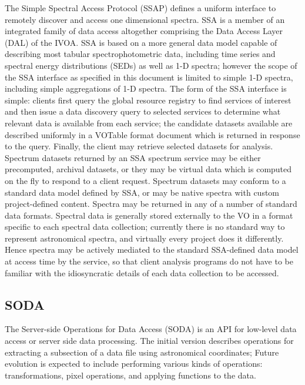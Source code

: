 \documentclass[11pt,letter]{ivoa}
\begin{document}
The Simple Spectral Access Protocol (SSAP) \citep{2012ivoa.spec.0210T}
defines a uniform interface to remotely discover and
access one dimensional spectra. SSA is a member of an integrated family
of data access
altogether comprising the Data Access Layer (DAL) of the IVOA. SSA is
based on a more
general data model capable of describing most tabular spectrophotometric
data, including
time series and spectral energy distributions (SEDs) as well as 1-D
spectra; however the
scope of the SSA interface as specified in this document is limited to
simple 1-D spectra,
including simple aggregations of 1-D spectra. The form of the SSA
interface is simple:
clients first query the global resource registry to find services of
interest and then
issue a data discovery query to selected services to determine what
relevant data is
available from each service; the candidate datasets available are
described uniformly
in a VOTable format document which is returned in response to the query.
Finally, the
client may retrieve selected datasets for analysis. Spectrum datasets
returned by an SSA
spectrum service may be either precomputed, archival datasets, or they
may be virtual
data which is computed on the fly to respond to a client request.
Spectrum datasets may
conform to a standard data model defined by SSA, or may be native
spectra with custom
project-defined content. Spectra may be returned in any of a number of
standard data
formats. Spectral data is generally stored externally to the VO in a
format specific to
each spectral data collection; currently there is no standard way to
represent astronomical
spectra, and virtually every project does it differently. Hence spectra
may be actively
mediated to the standard SSA-defined data model at access time by the
service, so that
client analysis programs do not have to be familiar with the
idiosyncratic details of each
data collection to be accessed. 

\subsection{SODA} 

The Server-side Operations for Data Access (SODA)
\citep{2017ivoa.spec.0517B} is an API for low-level data access or
server side
data processing. The initial version describes operations for extracting
a subsection of a data
file using astronomical coordinates; Future evolution is expected to
include performing
various kinds of operations: transformations, pixel operations, and
applying functions to the data.
\end{document}
